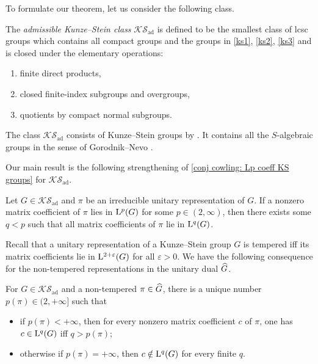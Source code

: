 \documentclass[a4paper, 10pt]{article}
\newcommand{\aks}{\mathcal{KS}_{\mathrm{ad}}}
\begin{document}
    To formulate our theorem, let us consider the following class.
    \begin{definition}
        The \emph{admissible Kunze--Stein class} $\aks$ is defined to be the smallest class of lcsc groups which contains all compact groups and the groups in \ref{ks1}, \ref{ks2}, \ref{ks3} and is closed under the elementary operations:
        \begin{enumerate}[label=(\alph*)]
        \item finite direct products,\label{a}
        \item closed finite-index subgroups and overgroups,\label{b}
        \item quotients by compact normal subgroups.\label{c}
    \end{enumerate}
    \end{definition}
    \begin{remark*}
        The class $\aks$ consists of Kunze--Stein groups by \cite[Lem 7.1]{cowling1978the-kunze-stein}. It contains all the $S$-algebraic groups in the sense of Gorodnik--Nevo \cite[Def 3.4]{gorodnik-nevo2009the-ergodic}.
    \end{remark*}

    Our main result is the following strengthening of \autoref{conj cowling: Lp coeff KS groups} for $\aks$.
    \begin{theorem}\label{mythm: S-algebraic, Lp irreducible ur}
        Let $G\in\aks$ and $\pi$ be an irreducible unitary representation of $G$. If a nonzero matrix coefficient of $\pi$ lies in $\mathrm{L}^p(G)$ for some $p\in (2,\infty)$, then there exists some $q<p$ such that all matrix coefficients of $\pi$ lie in $\mathrm{L}^{q}(G)$.
    \end{theorem}

    Recall that a unitary representation of a Kunze--Stein group $G$ is tempered iff its matrix coefficients lie in $\mathrm{L}^{2+
    \varepsilon}(G)$ for all $\varepsilon>0$. We have the following consequence for the non-tempered representations in the unitary dual $\widehat{G}$.

    \begin{corollary}
        For $G\in\aks$ and a non-tempered $\pi\in\widehat{G}$, there is a unique number $p(\pi)\in (2,+\infty]$ such that 
        \begin{itemize}
            \item if $p(\pi)<+\infty$, then for every nonzero matrix coefficient $c$ of $\pi$, one has $c\in\mathrm{L}^q(G)$ iff $q>p(\pi)$;
            \item otherwise if $p(\pi)=+\infty$, then $c\notin\mathrm{L}^q(G)$ for every finite $q$.
        \end{itemize}
    \end{corollary}
\end{document}
